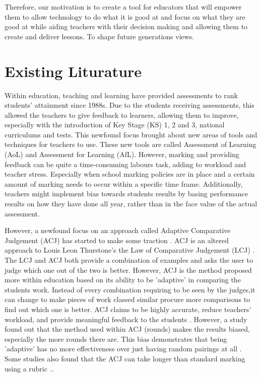 	Therefore, our motivation is to create a tool for educators that will empower them to allow technology to do what it is good at and focus on what they are good at while aiding teachers with their decision making and allowing them to create and deliver lessons. To shape future generations views.




	\section{Existing Liturature}
	Within education, teaching and learning have provided assessments to rank students' attainment since 1988s. Due to the students receiving assessments, this allowed the teachers to give feedback to learners, allowing them to improve, especially with the introduction of Key Stage (KS) 1, 2 and 3, national curriculums and tests. This newfound focus brought about new areas of tools and techniques for teachers to use. These new tools are called Assessment of Learning (AoL) and Assessment for Learning (AfL). However, marking and providing feedback can be quite a time-consuming labours task, adding to workload and teacher stress. Especially when school marking policies are in place and a certain amount of marking needs to occur within a specific time frame. Additionally, teachers might implement bias towards students results by basing performance results on how they have done all year, rather than in the face value of the actual assessment.
	
	However, a newfound focus on an approach called Adaptive Comparative Judgement (ACJ) has started to make some traction \cite{pollitt2012method}. ACJ is an altered approach to Louis Leon Thurstone's the Law of Comparative Judgement (LCJ) \cite{thurstone1927psychophysical}. The LCJ and ACJ both provide a combination of examples and asks the user to judge which one out of the two is better. However, ACJ is the method proposed more within education based on its ability to be 'adaptive' in comparing the students work. Instead of every combination requiring to be seen by the judges,it can change to make pieces of work classed similar procure more comparisons to find out which one is better. ACJ  claims to be highly accurate, reduce teachers' workload, and provide meaningful feedback to the students \cite{rm_website}. However, a study found out that the method used within ACJ (rounds) makes the results biased, especially the more rounds there are. This bias demonstrates that being 'adaptive' has no more effectiveness over just having random pairings at all \cite{bramley2015investigating}. Some studies also found that the ACJ can take longer than standard marking using a rubric \cite{mcmahon2015comparative, steedle2016evaluating}.\cite{mcmahon2015comparative, steedle2016evaluating}.
	
